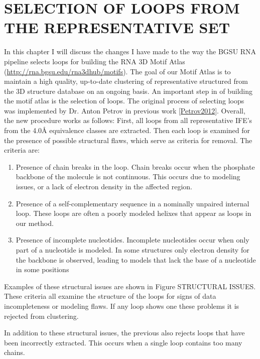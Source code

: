 \chapter{SELECTION OF LOOPS FROM THE REPRESENTATIVE SET}

In this chapter I will discuss the changes I have made to the way the BGSU RNA
pipeline selects loops for building the RNA 3D Motif Atlas
(\url{http://rna.bgsu.edu/rna3dhub/motifs}). The goal of our Motif Atlas is to
maintain a high quality, up-to-date clustering of representative structured from
the 3D structure database on an ongoing basis. An important step in of building
the motif atlas is the selection of loops. The original process of selecting
loops was implemented by Dr. Anton Petrov in previous work \ref{Petrov2012}.
Overall, the new procedure works as follows: First, all loops from all
representative IFE’s from the 4.0Å equivalence classes are extracted. Then each
loop is examined for the presence of possible structural flaws, which serve as
criteria for removal. The criteria are: 

\begin{enumerate}
  \item Presence of chain breaks in the loop. Chain breaks occur when the
    phosphate backbone of the molecule is not continuous. This occurs due to
    modeling issues, or a lack of electron density in the affected region.

  \item Presence of a self-complementary sequence in a nominally unpaired
    internal loop. These loops are often a poorly modeled helixes that appear as
    loops in our method.

  \item Presence of incomplete nucleotides. Incomplete nucleotides occur when
    only part of a nucleotide is modeled. In some structures only electron
    density for the backbone is observed, leading to models that lack the base
    of a nucleotide in some positions
\end{enumerate}

Examples of these structural issues are shown in Figure STRUCTURAL ISSUES. These
criteria all examine the structure of the loops for signs of data incompleteness
or modeling flaws. If any loop shows one these problems it is rejected from
clustering. 

In addition to these structural issues, the previous also rejects loops that
have been incorrectly extracted. This occurs when a single loop contains too
many chains.

